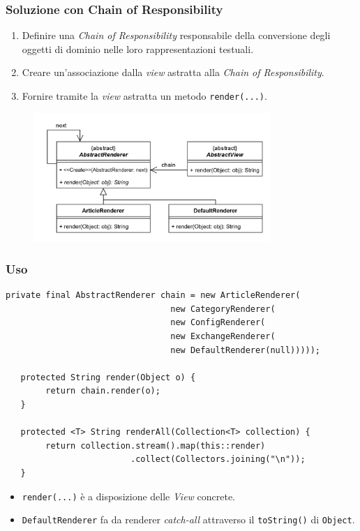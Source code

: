 \begin{frame}
    \frametitle{Soluzione con Chain of Responsibility}
    \begin{enumerate}
        \item Definire una \emph{Chain of Responsibility} responsabile della conversione degli oggetti
        di dominio nelle loro rappresentazioni testuali.
        \item Creare un'associazione dalla \emph{view} astratta alla \emph{Chain of Responsibility}.
        \item Fornire tramite la \emph{view} astratta un metodo \texttt{render(...)}.
    \end{enumerate}

    \begin{figure}
        \includegraphics[width=0.8\textwidth]{img/chain.png}
    \end{figure}
\end{frame}

\begin{frame}[fragile]
  \frametitle{Uso}
  \begin{lstlisting}[autogobble, title={\texttt{AbstractView.java}}]
   private final AbstractRenderer chain = new ArticleRenderer(
                                 new CategoryRenderer(
                                 new ConfigRenderer(
                                 new ExchangeRenderer(
                                 new DefaultRenderer(null)))));

   protected String render(Object o) {
        return chain.render(o);
   }

   protected <T> String renderAll(Collection<T> collection) {
        return collection.stream().map(this::render)
                         .collect(Collectors.joining("\n"));
   }
  \end{lstlisting}
    \begin{itemize}
        \item \texttt{render(...)} è a disposizione delle \emph{View} concrete.
        \item \texttt{DefaultRenderer} fa da renderer \emph{catch-all}
        attraverso il \texttt{toString()} di \texttt{Object}.
    \end{itemize}
\end{frame}

